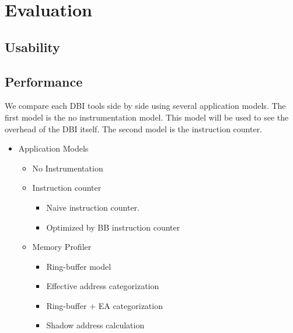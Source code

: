 
\section{Evaluation}
\label{sec:evaluation}
\subsection{Usability}
\subsection{Performance}
We compare each DBI tools side by side using several application models. The first model is the no instrumentation model.
This model will be used to see the overhead of the DBI itself. The second model is the instruction counter.
\begin{itemize}
	\item Application Models
	\begin{itemize}
		\item No Instrumentation
		\item Instruction counter
		\begin{itemize}
			\item Naive instruction counter.
			\item Optimized by BB instruction counter
		\end{itemize}
		\item Memory Profiler
		\begin{itemize}
			\item Ring-buffer model
			\item Effective address categorization
			\item Ring-buffer + EA categorization
			\item Shadow address calculation
		\end{itemize}
	\end{itemize}
\end{itemize}
